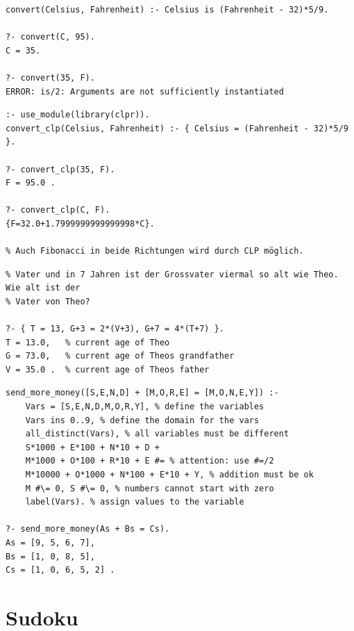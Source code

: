 \begin{lstlisting}[caption=Beispiel ohne CLP]
convert(Celsius, Fahrenheit) :-	Celsius is (Fahrenheit - 32)*5/9.

?- convert(C, 95).
C = 35.

?- convert(35, F).
ERROR: is/2: Arguments are not sufficiently instantiated
\end{lstlisting}

\begin{lstlisting}[caption=Beispiel mit CLP]
:- use_module(library(clpr)).
convert_clp(Celsius, Fahrenheit) :- { Celsius = (Fahrenheit - 32)*5/9 }.

?- convert_clp(35, F).
F = 95.0 .

?- convert_clp(C, F).
{F=32.0+1.7999999999999998*C}.

% Auch Fibonacci in beide Richtungen wird durch CLP möglich.
\end{lstlisting}

\begin{lstlisting}[caption=Typische CLP Aufgabe]
% Theo ist 13 Jahre alt. In 3 Jahren ist der Grossvater doppelt so alt wie Theo's 
% Vater und in 7 Jahren ist der Grossvater viermal so alt wie Theo. Wie alt ist der 
% Vater von Theo?

?- { T = 13, G+3 = 2*(V+3), G+7 = 4*(T+7) }.
T = 13.0, 	% current age of Theo
G = 73.0, 	% current age of Theos grandfather
V = 35.0 . 	% current age of Theos father
\end{lstlisting}

\begin{lstlisting}[caption=Zahlenrätsel]
send_more_money([S,E,N,D] + [M,O,R,E] = [M,O,N,E,Y]) :-
	Vars = [S,E,N,D,M,O,R,Y], % define the variables
	Vars ins 0..9, % define the domain for the vars
	all_distinct(Vars), % all variables must be different
	S*1000 + E*100 + N*10 + D +
	M*1000 + O*100 + R*10 + E #= % attention: use #=/2
	M*10000 + O*1000 + N*100 + E*10 + Y, % addition must be ok
	M #\= 0, S #\= 0, % numbers cannot start with zero
	label(Vars). % assign values to the variable

?- send_more_money(As + Bs = Cs).
As = [9, 5, 6, 7],
Bs = [1, 0, 8, 5],
Cs = [1, 0, 6, 5, 2] .
\end{lstlisting}

\newpage

\section{Sudoku}

